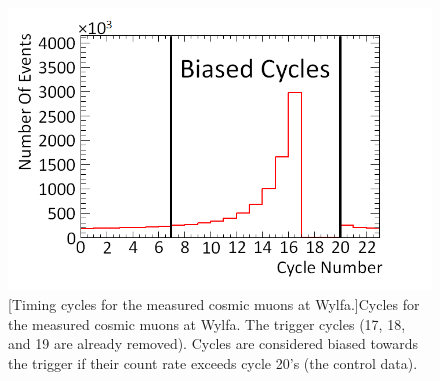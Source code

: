 \begin{figure}[!h]
 \centering
 \includegraphics[width=0.7\linewidth]{Chapter6/Figs/Raster/badCyclesRedoMedText.png}
 [Timing cycles for the measured cosmic muons at Wylfa.]{Cycles for the measured cosmic muons at Wylfa. The trigger cycles (17, 18, and 19 are already removed). Cycles are considered biased towards the trigger if their count rate exceeds cycle 20's (the control data).} 
 \label{fig:badCycles}
\end{figure}

